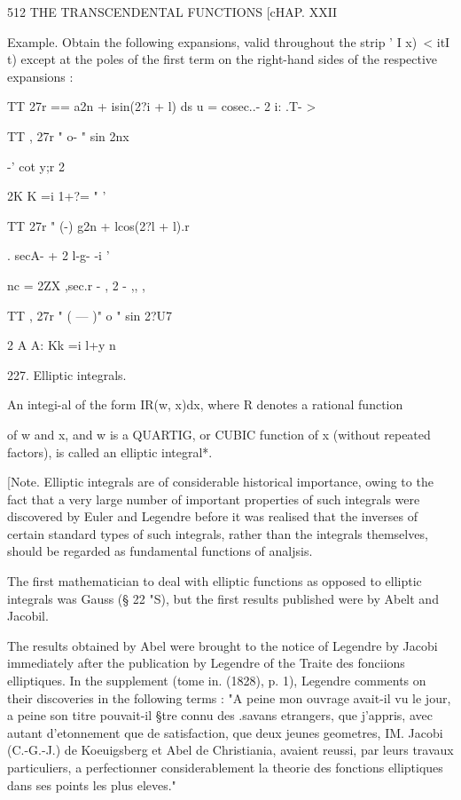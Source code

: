 512 THE TRANSCENDENTAL FUNCTIONS [cHAP. XXII 

Example. Obtain the following expansions, valid throughout the strip ' I  x)\ <  itI t) 
except at the poles of the first term on the right-hand sides of the respective expansions : 

TT 27r == a2n + isin(2?i + l)  
ds u =   cosec..-  2  i: .T-  > 

TT , 27r " o- " sin 2nx 

-' cot   y;r 2   



2K K  =i 1+?= " ' 

TT 27r "  (-) g2n + lcos(2?l + l).r 

 . secA- + 2  l-g-  -i ' 



nc  = 2ZX ,sec.r - , 2 - ,, , 

TT , 27r "  ( — )" o " sin 2?U7 

2 A A: Kk  =i l+y n 

227. Elliptic integrals. 

An integi-al of the form IR(w, x)dx, where R denotes a rational function 

of w and x, and w  is a QUARTIG, or CUBIC function of x (without repeated 
factors), is called an elliptic integral*. 

[Note. Elliptic integrals are of considerable historical importance, owing to the fact 
that a very large number of important properties of such integrals were discovered by 
Euler and Legendre before it was realised that the inverses of certain standard types of 
such integrals, rather than the integrals themselves, should be regarded as fundamental 
functions of analjsis. 

The first mathematician to deal with elliptic functions as opposed to elliptic integrals 
was Gauss (§ 22 "S), but the first results published were by Abelt and Jacobil. 

The results obtained by Abel were brought to the notice of Legendre by Jacobi 
immediately after the publication by Legendre of the Traite des fonciions elliptiques. In 
the supplement (tome in. (1828), p. 1), Legendre comments on their discoveries in the 
following terms : "A peine mon ouvrage avait-il vu le jour, a peine son titre pouvait-il §tre 
connu des .savans etrangers, que j'appris, avec autant d'etonnement que de satisfaction, 
que deux jeunes geometres,  IM. Jacobi (C.-G.-J.) de Koeuigsberg et Abel de Christiania, 
avaient reussi, par leurs travaux particuliers, a perfectionner considerablement la theorie 
des fonctions elliptiques dans ses points les plus eleves." 

